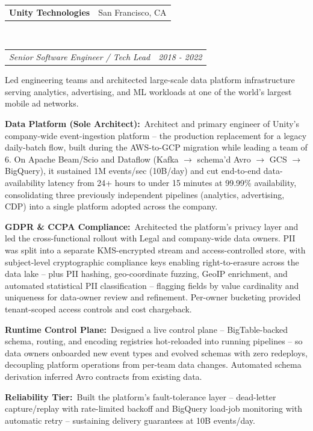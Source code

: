 \documentclass[11pt,letterpaper]{article}
\makeatletter
\newcommand{\area}[2]{{\bfseries\color{accent}#1:}~#2}
\newcommand{\headerrow}[2]{%
  \begin{tabular*}{\linewidth}{@{}l@{\extracolsep{\fill}}r@{}}#1 & #2\end{tabular*}}
\newcommand{\employment}[5]{%
  \headerrow{\textbf{#1}}{\color{muted}#2}\\
  \headerrow{{\itshape\color{accent}#3}}{\color{muted}\itshape #4}
  \begin{itemize*}
    \item #5
  \end{itemize*}
}
\makeatother
\begin{document}
\employment{Unity Technologies}{San Francisco, CA}{Senior Software Engineer / Tech Lead}{2018 - 2022}{
Led engineering teams and architected large-scale data platform infrastructure serving analytics, advertising, and ML workloads at one of the world's largest mobile ad networks.
\item \area{Data Platform (Sole Architect)}{Architect and primary engineer of Unity's company-wide event-ingestion platform -- the production replacement for a legacy daily-batch flow, built during the AWS-to-GCP migration while leading a team of 6. On Apache Beam/Scio and Dataflow (Kafka $\to$ schema'd Avro $\to$ GCS $\to$ BigQuery), it sustained 1M events/sec (10B/day) and cut end-to-end data-availability latency from 24+ hours to under 15 minutes at 99.99\% availability, consolidating three previously independent pipelines (analytics, advertising, CDP) into a single platform adopted across the company.}
\item \area{GDPR \& CCPA Compliance}{Architected the platform's privacy layer and led the cross-functional rollout with Legal and company-wide data owners. PII was split into a separate KMS-encrypted stream and access-controlled store, with subject-level cryptographic compliance keys enabling right-to-erasure across the data lake -- plus PII hashing, geo-coordinate fuzzing, GeoIP enrichment, and automated statistical PII classification -- flagging fields by value cardinality and uniqueness for data-owner review and refinement. Per-owner bucketing provided tenant-scoped access controls and cost chargeback.}
\item \area{Runtime Control Plane}{Designed a live control plane -- BigTable-backed schema, routing, and encoding registries hot-reloaded into running pipelines -- so data owners onboarded new event types and evolved schemas with zero redeploys, decoupling platform operations from per-team data changes. Automated schema derivation inferred Avro contracts from existing data.}
\item \area{Reliability Tier}{Built the platform's fault-tolerance layer -- dead-letter capture/replay with rate-limited backoff and BigQuery load-job monitoring with automatic retry -- sustaining delivery guarantees at 10B events/day.}
}
\end{document}
